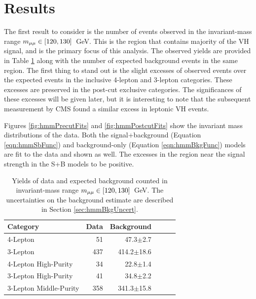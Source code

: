 \section{Results}\label{sec:hmmResults}

The first result to consider is the number of events observed in the invariant-mass range $m_{\mu\mu}\in[120,130]$~GeV.
This is the region that contains majority of the VH signal, and is the primary focus of this analysis.
The observed yields are provided in Table \ref{tab:hmmResultNdat} along with the number of expected background events in the same region.
The first thing to stand out is the slight excesses of observed events over the expected events in the inclusive 4-lepton and 3-lepton categories.
These excesses are preserved in the post-cut exclusive categories.
The significances of these excesses will be given later, but it is interesting to note that the subsequent measurement by CMS found a similar excess in leptonic VH events. 

Figures \ref{fig:hmmPrecutFits} and \ref{fig:hmmPostcutFits} show the invariant mass distributions of the data.
Both the signal+background (Equation \ref{eqn:hmmSbFunc}) and background-only (Equation \ref{eqn:hmmBkgFunc}) models are fit to the data  and shown as well.
The excesses in the region near the signal strength in the S+B models to be positive.

\begin{table}[htp]
\begin{center}
\begin{tabular}{l r r r r r}\toprule
Category               & Data    & Background \\
\midrule
4-Lepton               & 51      & 47.3$\pm$2.7 \\
3-Lepton               & 437     & 414.2$\pm$18.6 \\
\midrule
4-Lepton High-Purity   & 34      & 22.8$\pm$1.4 \\
3-Lepton High-Purity   & 41      & 34.8$\pm$2.2 \\
3-Lepton Middle-Purity & 358     & 341.3$\pm$15.8 \\
\bottomrule\end{tabular}\\
\caption{
Yields of data and expected background counted in invariant-mass range $m_{\mu\mu}\in[120,130]$~GeV.
The uncertainties on the background estimate are described in Section \ref{sec:hmmBkgUncert}.
}
\label{tab:hmmResultNdat}
\end{center}
\end{table}


